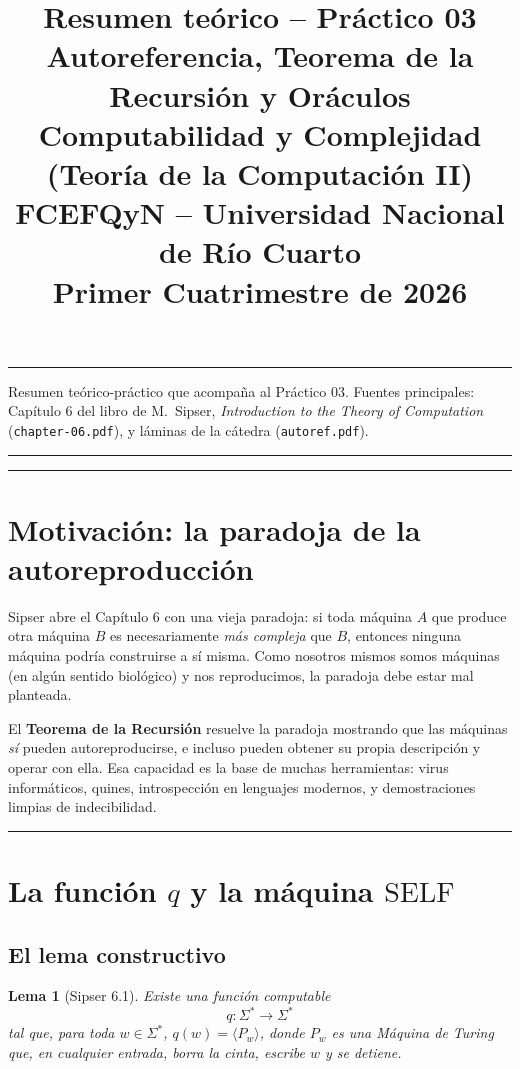 \documentclass[11pt,a4paper]{article}
\title{\textbf{Resumen te\'orico -- Pr\'actico 03}\\[0.2em]
       \textbf{Autoreferencia, Teorema de la Recursi\'on y Or\'aculos}\\[0.3em]
       \normalsize Computabilidad y Complejidad (Teor\'ia de la Computaci\'on II)\\
       \normalsize FCEFQyN -- Universidad Nacional de R\'io Cuarto\\
       \normalsize Primer Cuatrimestre de 2026}
\author{}
\date{}
\theoremstyle{plain}
\newtheorem{lema}[teorema]{Lema}
\theoremstyle{definition}
\theoremstyle{remark}
\newcommand{\enc}[1]{\langle #1\rangle}
\newcommand{\Sstar}{\Sigma^{*}}
\newcommand{\SELF}{\mathrm{SELF}}
\newcommand{\Pw}[1]{P_{#1}}
\begin{document}
\maketitle
\thispagestyle{empty}

\hrule
\vspace{0.4em}
\begin{center}
\small
Resumen te\'orico-pr\'actico que acompa\~na al Pr\'actico 03. Fuentes
principales: Cap\'itulo 6 del libro de M.~Sipser, \emph{Introduction to the
Theory of Computation} (\texttt{chapter-06.pdf}), y l\'aminas de la c\'atedra
(\texttt{autoref.pdf}).
\end{center}
\vspace{0.4em}
\hrule

\tableofcontents
\bigskip\hrule\bigskip

\section{Motivaci\'on: la paradoja de la autoreproducci\'on}

Sipser abre el Cap\'itulo 6 con una vieja paradoja: si toda m\'aquina $A$
que produce otra m\'aquina $B$ es necesariamente \emph{m\'as compleja} que
$B$, entonces ninguna m\'aquina podr\'ia construirse a s\'i misma. Como
nosotros mismos somos m\'aquinas (en alg\'un sentido biol\'ogico) y nos
reproducimos, la paradoja debe estar mal planteada.

El \textbf{Teorema de la Recursi\'on} resuelve la paradoja mostrando que las
m\'aquinas \emph{s\'i} pueden autoreproducirse, e incluso pueden obtener su
propia descripci\'on y operar con ella. Esa capacidad es la base de muchas
herramientas: virus inform\'aticos, quines, introspecci\'on en lenguajes
modernos, y demostraciones limpias de indecibilidad.

\bigskip\hrule\bigskip

\section{La funci\'on $q$ y la m\'aquina $\SELF$}

\subsection{El lema constructivo}

\begin{lema}[Sipser 6.1]
\label{lem:q}
Existe una funci\'on computable
\[
  q:\Sstar \longrightarrow \Sstar
\]
tal que, para toda $w\in\Sstar$, $q(w)=\enc{\Pw{w}}$, donde $\Pw{w}$ es una
M\'aquina de Turing que, en cualquier entrada, borra la cinta, escribe $w$ y
se detiene.
\end{lema}
\end{document}
